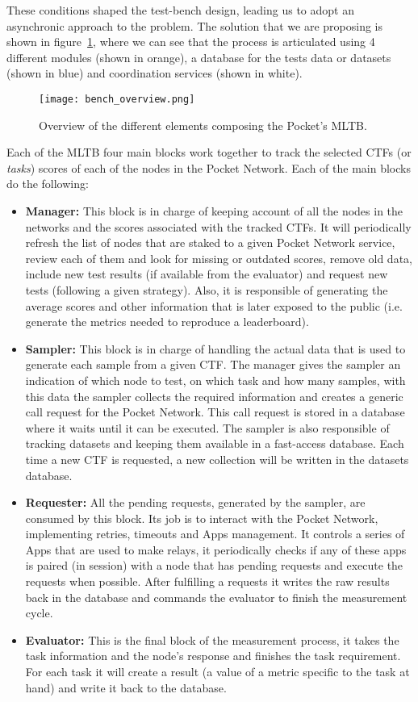These conditions shaped the test-bench design, leading us to adopt an asynchronic approach to the problem. The solution that we are proposing is shown in figure~\ref{fig:bench_overview}, where we can see that the process is articulated using 4 different modules (shown in orange), a database for the tests data or datasets (shown in blue) and coordination services (shown in white).
\begin{figure}[H]
    \centering
    \texttt{[image: bench\_overview.png]}
    \caption{Overview of the different elements composing the Pocket's \gls{MLTB}.}
    \label{fig:bench_overview}
\end{figure}
Each of the \gls{MLTB} four main blocks work together to track the selected \gls{CTF}s (or \emph{tasks}) scores of each of the nodes in the Pocket Network. Each of the main blocks do the following:
\begin{itemize}
    \item \textbf{Manager:} This block is in charge of keeping account of all the nodes in the networks and the scores associated with the tracked \gls{CTF}s. It will periodically refresh the list of nodes that are staked to a given Pocket Network service, review each of them and look for missing or outdated scores, remove old data, include new test results (if available from the evaluator) and request new tests (following a given strategy). Also, it is responsible of generating the average scores and other information that is later exposed to the public (i.e. generate the metrics needed to reproduce a leaderboard).
    \item \textbf{Sampler:} This block is in charge of handling the actual data that is used to generate each sample from a given \gls{CTF}. The manager gives the sampler an indication of which node to test, on which task and how many samples, with this data the sampler collects the required information and creates a generic call request for the Pocket Network. This call request is stored in a database where it waits until it can be executed. The sampler is also responsible of tracking datasets and keeping them available in a fast-access database. Each time a new \gls{CTF} is requested, a new collection will be written in the datasets database.
    \item \textbf{Requester:} All the pending requests, generated by the sampler, are consumed by this block. Its job is to interact with the Pocket Network, implementing retries, timeouts and Apps management. It controls a series of Apps that are used to make relays, it periodically checks if any of these apps is paired (in session) with a node that has pending requests and execute the requests when possible. After fulfilling a requests it writes the raw results back in the database and commands the evaluator to finish the measurement cycle. 
    \item \textbf{Evaluator:} This is the final block of the measurement process, it takes the task information and the node's response and finishes the task requirement. For each task it will create a result (a value of a metric specific to the task at hand) and write it back to the database.
\end{itemize}

